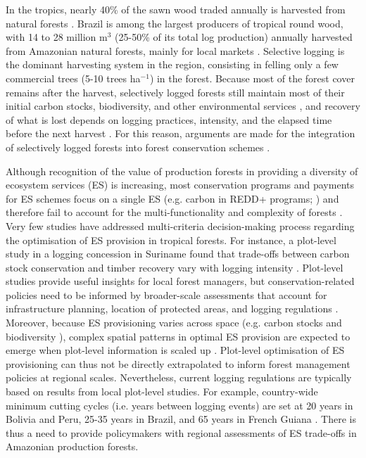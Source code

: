 \documentclass{article}
\begin{document}
In the tropics, nearly 40\% of the sawn wood traded annually is harvested from natural forests \cite{Payn2015}. Brazil is among the largest producers of tropical round wood, with 14 to 28 million m$^3$ (25-50\% of its total log production) annually harvested from Amazonian natural forests, mainly for local markets \cite{SFB2010,Santos2013,FAOstat2019}. Selective logging is the dominant harvesting system in the region, consisting in felling only a few commercial trees (5-10 trees ha$^{-1}$) in the forest. Because most of the forest cover remains after the harvest, selectively logged forests still maintain most of their initial carbon stocks, biodiversity, and other environmental services \cite{Putz2012}, and recovery of what is lost depends on logging practices, intensity, and the elapsed time before the next harvest \cite{Rutishauser2015,Piponiot2018}. For this reason, arguments are made for the integration of selectively logged forests into forest conservation schemes \cite{Edwards2014a}.  

Although recognition of the value of production forests in providing a diversity of ecosystem services (ES) is increasing, most conservation programs and payments for ES schemes focus on a single ES (e.g. carbon in REDD+ programs; \cite{Laing2016}) and therefore fail to account for the multi-functionality and complexity of forests \cite{VanderPlas2017}. Very few studies have addressed multi-criteria decision-making process regarding the optimisation of ES provision in tropical forests. For instance, a plot-level study in a logging concession in Suriname found that trade-offs between carbon stock conservation and timber recovery vary with logging intensity \cite{Roopsind2018}. Plot-level studies provide useful insights for local forest managers, but conservation-related policies need to be informed by broader-scale assessments that account for infrastructure planning, location of protected areas, and logging regulations \cite{Hein2006b}. Moreover, because ES provisioning varies across space (e.g. carbon stocks \cite{Avitabile2016} and biodiversity \cite{Jenkins2013}), complex spatial patterns in optimal ES provision are expected to emerge when plot-level information is scaled up \cite{Gibson2000}. Plot-level optimisation of ES provisioning can thus not be directly extrapolated to inform forest management policies at regional scales. Nevertheless, current logging regulations are typically based on results from local plot-level studies. For example, country-wide minimum cutting cycles (i.e. years between logging events) are set at 20 years in Bolivia and Peru, 25-35 years in Brazil, and 65 years in French Guiana \cite{Blaser2011}. There is thus a need to provide policymakers with regional assessments of ES trade-offs in Amazonian production forests.  
\end{document}
